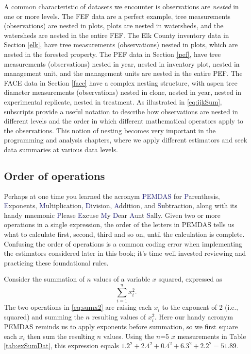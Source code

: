 \documentclass[
  11pt,
]{krantz}
\theoremstyle{definition}
\theoremstyle{definition}
\theoremstyle{definition}
\theoremstyle{definition}
\theoremstyle{remark}
\begin{document}
A common characteristic of datasets we encounter is observations are \emph{nested} in one or more levels. The FEF data are a perfect example, tree measurements (observations) are nested in plots, plots are nested in watersheds, and the watersheds are nested in the entire FEF. The Elk County inventory data in Section \ref{elk}, have tree measurements (observations) nested in plots, which are nested in the forested property. The PEF data in Section \ref{pef}, have tree measurements (observations) nested in year, nested in inventory plot, nested in management unit, and the management units are nested in the entire PEF. The FACE data in Section \ref{face} have a complex nesting structure, with aspen tree diameter measurements (observations) nested in clone, nested in year, nested in experimental replicate, nested in treatment. As illustrated in \eqref{eq:ijkSum}, subscripts provide a useful notation to describe how observations are nested in different levels and the order in which different mathematical operators apply to the observations. This notion of nesting becomes very important in the programming and analysis chapters, where we apply different estimators and seek data summaries at various data levels.

\hypertarget{padma}{%
\subsection{Order of operations}\label{padma}}

Perhaps at one time you learned the acronym \textcolor{MidnightBlue}{PEMDAS} for \textcolor{MidnightBlue}{P}arenthesis, \textcolor{MidnightBlue}{E}xponents, \textcolor{MidnightBlue}{M}ultiplication, \textcolor{MidnightBlue}{D}ivision, \textcolor{MidnightBlue}{A}ddition, and \textcolor{MidnightBlue}{S}ubtraction, along with its handy mnemonic \textcolor{MidnightBlue}{P}lease \textcolor{MidnightBlue}{E}xcuse \textcolor{MidnightBlue}{M}y \textcolor{MidnightBlue}{D}ear \textcolor{MidnightBlue}{A}unt \textcolor{MidnightBlue}{S}ally. Given two or more operations in a single expression, the order of the letters in PEMDAS tells us what to calculate first, second, third and so on, until the calculation is complete. Confusing the order of operations is a common coding error when implementing the estimators considered later in this book; it's time well invested reviewing and practicing these foundational rules.

Consider the summation of \(n\) values of a variable \(x\) squared, expressed as
\begin{equation}
\sum^n_{i=1}x_i^2.
\label{eq:sumx2}
\end{equation}
The two operations in \eqref{eq:sumx2} are raising each \(x_i\) to the exponent of 2 (i.e., squared) and summing the \(n\) resulting values of \(x_i^2\). Here our handy acronym P{E}MDA{S} reminds us to apply exponents before summation, so we first square each \(x_i\) then sum the resulting \(n\) values. Using the \(n\)=5 \(x\) measurements in Table \ref{tab:exSumDat}, this expression equals \(1.2^2 + 2.4^2 + 0.4^2 + 6.3^2 + 2.2^2 = 51.89\).
\end{document}
